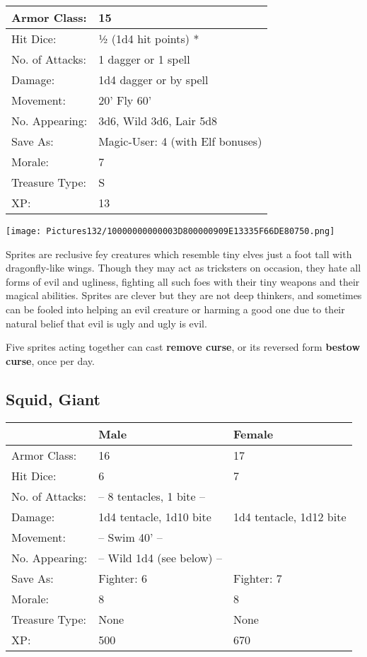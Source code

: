 \documentclass[a4paper,twoside,openany,10pt]{book}
\begin{document}
\begin{multicols}{2}
\begin{tabularx}{0.50\textwidth}{@{}lX@{}}
Armor Class: & 15 \\\hline
Hit Dice: & ½ (1d4 hit points) * \\\hline
No. of Attacks: & 1 dagger or 1 spell \\\hline
Damage: & 1d4 dagger or by spell \\\hline
Movement: & 20' Fly 60' \\\hline
No. Appearing: & 3d6, Wild 3d6, Lair 5d8 \\\hline
Save As: & Magic-User: 4 (with Elf bonuses) \\\hline
Morale: & 7 \\\hline
Treasure Type: & S \\\hline
XP: & 13 \\\hline
\end{tabularx}\medskip

\begin{center}
\texttt{[image: Pictures132/10000000000003D800000909E13335F66DE80750.png]}
\end{center}

Sprites are reclusive fey creatures which resemble tiny elves just a foot tall with dragonfly-like wings. Though they may act as tricksters on occasion, they hate all forms of evil and ugliness, fighting all such foes with their tiny weapons and their magical abilities. Sprites are clever but they are not deep thinkers, and sometimes can be fooled into helping an evil creature or harming a good one due to their natural belief that evil is ugly and ugly is evil. 

Five sprites acting together can cast \textbf{remove curse}, or its reversed form \textbf{bestow curse}, once per day.

\subsection*{Squid, Giant}\label{squid-giant}

\begin{tabularx}{0.50\textwidth}{@{}lXX@{}}
& Male & Female \\\hline
Armor Class: & 16 & 17 \\\hline
Hit Dice: & 6 & 7 \\\hline
No. of Attacks: & -- 8 tentacles, 1 bite -- & \\\hline
Damage: & 1d4 tentacle, 1d10 bite & 1d4 tentacle, 1d12 bite \\\hline
Movement: & -- Swim 40' -- & \\\hline
No. Appearing: & -- Wild 1d4 (see below) -- & \\\hline
Save As: & Fighter: 6 & Fighter: 7 \\\hline
Morale: & 8 & 8 \\\hline
Treasure Type: & None & None \\\hline
XP: & 500 & 670 \\\hline
\end{tabularx}\medskip


\end{multicols}
\end{document}
